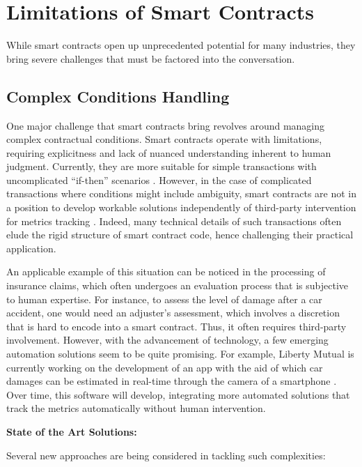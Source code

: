 \section{Limitations of Smart Contracts}

While smart contracts open up unprecedented potential for many industries, they bring severe challenges that must be factored into the conversation.

\subsection{Complex Conditions Handling}

One major challenge that smart contracts bring revolves around managing complex contractual conditions. Smart contracts operate with limitations, requiring explicitness and lack of nuanced understanding inherent to human judgment. Currently, they are more suitable for simple transactions with uncomplicated ``if-then'' scenarios \cite{Durovic2021}. However, in the case of complicated transactions where conditions might include ambiguity, smart contracts are not in a position to develop workable solutions independently of third-party intervention for metrics tracking \cite{Borselli2020}. Indeed, many technical details of such transactions often elude the rigid structure of smart contract code, hence challenging their practical application.

An applicable example of this situation can be noticed in the processing of insurance claims, which often undergoes an evaluation process that is subjective to human expertise. For instance, to assess the level of damage after a car accident, one would need an adjuster's assessment, which involves a discretion that is hard to encode into a smart contract. Thus, it often requires third-party involvement. However, with the advancement of technology, a few emerging automation solutions seem to be quite promising. For example, Liberty Mutual is currently working on the development of an app with the aid of which car damages can be estimated in real-time through the camera of a smartphone \cite{Borselli2020}. Over time, this software will develop, integrating more automated solutions that track the metrics automatically without human intervention.

\textbf{State of the Art Solutions:}

Several new approaches are being considered in tackling such complexities:

